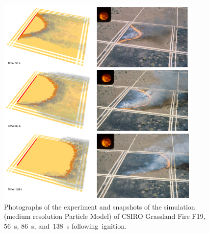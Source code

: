 \documentclass[atmosphere,article,accept,moreauthors,pdftex]{Definitions/mdpi}
\begin{document}
\begin{figure}[H]
\widefigure
\includegraphics[width=0.9\textwidth]{figures/F19_collage.png}
\caption{Photographs of the experiment and snapshots of the simulation (medium resolution Particle Model) of CSIRO Grassland Fire F19, 56~s, 86~s, and~138~s following~ignition.}
\label{F19}
\end{figure}
\end{document}
